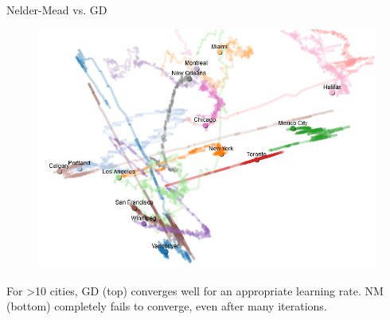 \documentclass[11pt,compress,t,notes=noshow, xcolor=table]{beamer}
\begin{document}
\begin{vbframe}{Nelder-Mead vs. GD}
\begin{figure}
\begin{minipage}{0.45\textwidth}
    \end{minipage}\hfill
    \begin{minipage}{0.45\textwidth}
        \centering
        \includegraphics[width = 0.8\linewidth]{figure_man/nm_gd_cities_4.PNG}
    \end{minipage}
\end{figure}
\vspace*{0.2cm}
\begin{footnotesize}
For >10 cities, GD (top) converges well for an appropriate learning rate. NM (bottom) completely fails to converge, even after many iterations.
\end{footnotesize}



\end{vbframe}
\end{document}
